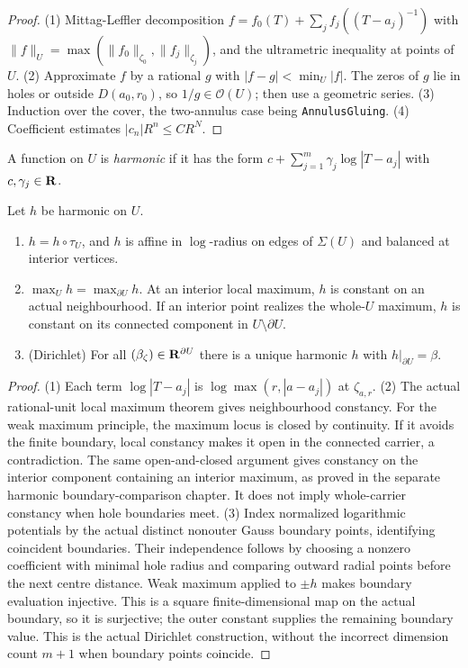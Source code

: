 \begin{proof}
(1) Mittag-Leffler decomposition $f=f_0(T)+\sum_jf_j((T-a_j)^{-1})$ with $\|f\|_U=\max(\|f_0\|_{\zeta_0},\|f_j\|_{\zeta_j})$, and
the ultrametric inequality at points of $U$. (2) Approximate $f$ by a rational $g$ with $|f-g|<\min_U|f|$. The zeros of
$g$ lie in holes or outside $D(a_0,r_0)$, so $1/g\in\mathcal O(U)$; then use a geometric series. (3) Induction over the
cover, the two-annulus case being \texttt{AnnulusGluing}. (4) Coefficient estimates $|c_n|R^n\le CR^N$.
\end{proof}

\begin{definition}\label{def:fc-harmonic}
\notready
{}
A function on $U$ is \emph{harmonic} if it has the form $c+\sum_{j=1}^m\gamma_j\log|T-a_j|$ with $c,\gamma_j\in\mathbf{R}$.
\end{definition}

\begin{lemma}\label{lem:fc-harmonic}
\notready
{}
Let $h$ be harmonic on $U$.
\begin{enumerate}
\item $h=h\circ\tau_U$, and $h$ is affine in $\log$-radius on edges of $\Sigma(U)$ and balanced at interior vertices.
\item $\max_Uh=\max_{\partial U}h$. At an interior local maximum, $h$ is constant on an actual neighbourhood. If an interior point realizes the whole-$U$ maximum, $h$ is constant on its connected component in $U\setminus\partial U$.
\item (Dirichlet) For all $(\beta_\zeta)\in\mathbf{R}^{\partial U}$ there is a unique harmonic $h$ with $h|_{\partial U}=\beta$.
\end{enumerate}
\end{lemma}

\begin{proof}
(1) Each term $\log|T-a_j|$ is $\log\max(r,|a-a_j|)$ at $\zeta_{a,r}$.
(2) The actual rational-unit local maximum theorem gives neighbourhood constancy.
For the weak maximum principle, the maximum locus is closed by continuity. If it
avoids the finite boundary, local constancy makes it open in the connected carrier,
a contradiction. The same open-and-closed argument gives constancy on the interior
component containing an interior maximum, as proved in the separate harmonic
boundary-comparison chapter. It does not imply whole-carrier constancy when hole
boundaries meet. (3) Index normalized logarithmic potentials by the actual distinct
nonouter Gauss boundary points, identifying coincident boundaries. Their independence
follows by choosing a nonzero coefficient with minimal hole radius and comparing
outward radial points before the next centre distance. Weak maximum applied to
$\pm h$ makes boundary evaluation injective. This is a square finite-dimensional
map on the actual boundary, so it is surjective; the outer constant supplies the
remaining boundary value. This is the actual Dirichlet construction, without the
incorrect dimension count $m+1$ when boundary points coincide.
\end{proof}

